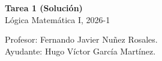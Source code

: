 \documentclass[letterpaper,DIV=15,headsepline,12pt]{scrartcl}
\begin{document}
    \thispagestyle{beginstyle}
    \begin{center}
        {\fontsize{30}{60}\rmfamily \textbf{Tarea 1 (Solución)}} \\ \vspace{.2cm}
        Lógica Matemática I, 2026-1
    \end{center}
    \begin{flushright}
        \footnotesize \hfill Profesor: Fernando Javier Nuñez Rosales.\\
        \hfill Ayudante: Hugo Víctor García Martínez.
    \end{flushright}
\end{document}
